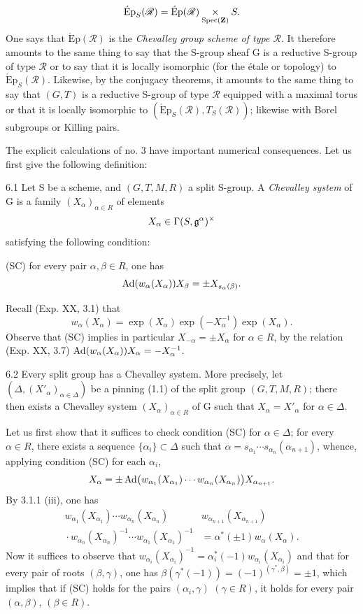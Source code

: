 \[
\mathrm{\acute Ep}_S(\mathscr R)=\mathrm{\acute Ep}(\mathscr R)\underset{\operatorname{Spec}(\mathbf{Z})}{\times}S.
\]
One says that $\mathrm{\acute Ep}(\mathscr R)$ is the \emph{Chevalley group scheme of type $\mathscr R$}.
It therefore amounts to the same thing to say that the S-group sheaf G is a reductive S-group of type $\mathscr R$ or to say that it is locally isomorphic (for the étale or \fpqc topology) to $\mathrm{\acute Ep}_S(\mathscr R)$. Likewise, by the conjugacy theorems, it amounts to the same thing to say that $(G,T)$ is a reductive S-group of type $\mathscr R$ equipped with a maximal torus or that it is locally isomorphic to $(\mathrm{\acute Ep}_S(\mathscr R),T_S(\mathscr R))$; likewise with Borel subgroups or Killing pairs.

The explicit calculations of no. 3 have important numerical consequences. Let us first give the following definition:
\begin{definition}{6.1}\label{XXIII.6.1}
Let S be a scheme, and $(G,T,M,R)$ a split S-group. A \emph{Chevalley system} of G is a family $(X_\alpha)_{\alpha\in R}$ of elements
\[
X_\alpha\in\Gamma(S,\mathfrak g^\alpha)^\times
\]
satisfying the following condition:

(SC) for every pair $\alpha,\beta\in R$, one has
\[
\operatorname{Ad}(w_\alpha(X_\alpha))X_\beta=\pm X_{s_\alpha(\beta)}.
\]
\end{definition}
Recall (Exp. XX, 3.1) that
\[
w_\alpha(X_\alpha)=\exp(X_\alpha)\exp(-X_\alpha^{-1})\exp(X_\alpha).
\]
Observe that (SC) implies in particular $X_{-\alpha}=\pm X_\alpha$ for $\alpha\in R$, by the relation (Exp. XX, 3.7) $\operatorname{Ad}(w_\alpha(X_\alpha))X_\alpha=-X_\alpha^{-1}$.
\begin{proposition}{6.2}\label{XXIII.6.2}
Every split group has a Chevalley system. More precisely, let $(\Delta,(X'_\alpha)_{\alpha\in\Delta})$ be a pinning (1.1) of the split group $(G,T,M,R)$; there then exists a Chevalley system $(X_\alpha)_{\alpha\in R}$ of G such that $X_\alpha=X'_\alpha$ for $\alpha\in\Delta$.
\end{proposition}
Let us first show that it suffices to check condition (SC) for $\alpha\in\Delta$; for every $\alpha\in R$, there exists a sequence $\{\alpha_i\}\subset\Delta$ such that $\alpha=s_{\alpha_1}\cdots s_{\alpha_n}(\alpha_{n+1})$, whence, applying condition (SC) for each $\alpha_i$,
\[
X_\alpha=\pm\operatorname{Ad}\bigl(w_{\alpha_1}(X_{\alpha_1})\cdots w_{\alpha_n}(X_{\alpha_n})\bigr)X_{\alpha_{n+1}}.
\]
By 3.1.1 (iii), one has
\[
\begin{split}
w_{\alpha_1}(X_{\alpha_1})\cdots w_{\alpha_n}(X_{\alpha_n})&w_{\alpha_{n+1}}(X_{\alpha_{n+1}})\\
{}\cdot w_{\alpha_n}(X_{\alpha_n})^{-1}\cdots w_{\alpha_1}(X_{\alpha_1})^{-1}&=\alpha^*(\pm1)w_\alpha(X_\alpha).
\end{split}
\]
Now it suffices to observe that $w_{\alpha_i}(X_{\alpha_i})^{-1}=\alpha_i^*(-1)w_{\alpha_i}(X_{\alpha_i})$ and that for every pair of roots $(\beta,\gamma)$, one has $\beta(\gamma^*(-1))=(-1)^{(\gamma^*,\beta)}=\pm1$, which implies that if (SC) holds for the pairs $(\alpha_i,\gamma)$ $(\gamma\in R)$, it holds for every pair $(\alpha,\beta)$, $(\beta\in R)$.

